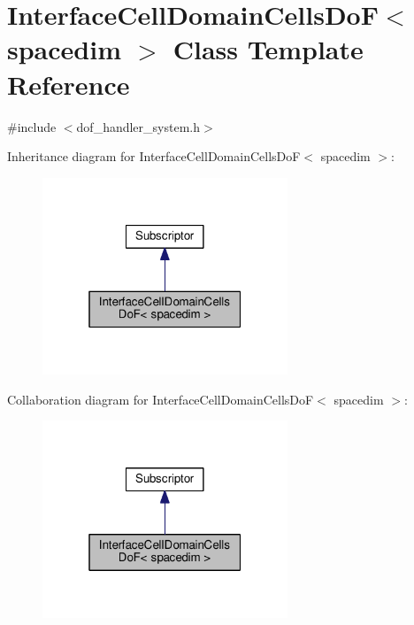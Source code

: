 \hypertarget{class_interface_cell_domain_cells_do_f}{}\section{Interface\+Cell\+Domain\+Cells\+DoF$<$ spacedim $>$ Class Template Reference}
\label{class_interface_cell_domain_cells_do_f}


{\ttfamily \#include $<$dof\+\_\+handler\+\_\+system.\+h$>$}



Inheritance diagram for Interface\+Cell\+Domain\+Cells\+DoF$<$ spacedim $>$\+:\nopagebreak
\begin{figure}[H]
\begin{center}
\leavevmode
\includegraphics[width=208pt]{class_interface_cell_domain_cells_do_f__inherit__graph}
\end{center}
\end{figure}


Collaboration diagram for Interface\+Cell\+Domain\+Cells\+DoF$<$ spacedim $>$\+:\nopagebreak
\begin{figure}[H]
\begin{center}
\leavevmode
\includegraphics[width=208pt]{class_interface_cell_domain_cells_do_f__coll__graph}
\end{center}
\end{figure}

